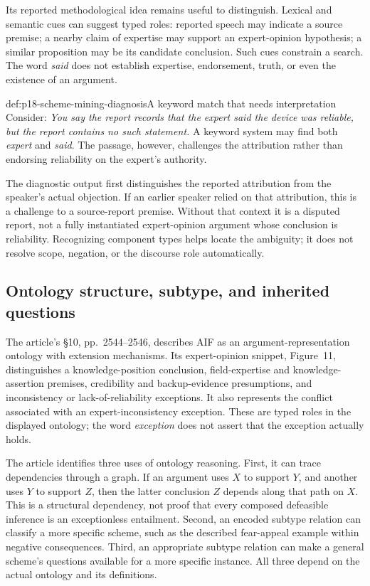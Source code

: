 Its reported methodological idea remains useful to distinguish.
Lexical and semantic cues can suggest typed roles: reported speech
may indicate a source premise; a nearby claim of expertise may
support an expert-opinion hypothesis; a similar proposition may
be its candidate conclusion. Such cues constrain a search.
The word \emph{said} does not establish expertise, endorsement,
truth, or even the existence of an argument.

\begin{hbexample}{def:p18-scheme-mining-diagnosis}{A keyword match that needs interpretation}
Consider: \emph{You say the report records that the expert said the
device was reliable, but the report contains no such statement.}
A keyword system may find both \emph{expert} and \emph{said}.
The passage, however, challenges the attribution rather than
endorsing reliability on the expert's authority.

The diagnostic output first distinguishes the reported attribution
from the speaker's actual objection. If an earlier speaker relied
on that attribution, this is a challenge to a source-report premise.
Without that context it is a disputed report, not a fully instantiated
expert-opinion argument whose conclusion is reliability.
Recognizing component types helps locate the ambiguity; it does
not resolve scope, negation, or the discourse role automatically.
\end{hbexample}

\subsection{Ontology structure, subtype, and inherited questions}

The article's \S10, pp.~2544--2546, describes AIF as an
argument-representation ontology with extension mechanisms.
Its expert-opinion snippet, Figure~11, distinguishes a knowledge-position
conclusion, field-expertise and knowledge-assertion premises,
credibility and backup-evidence presumptions, and inconsistency
or lack-of-reliability exceptions. It also represents the conflict
associated with an expert-inconsistency exception.
These are typed roles in the displayed ontology; the word
\emph{exception} does not assert that the exception actually holds.

The article identifies three uses of ontology reasoning.
First, it can trace dependencies through a graph. If an argument
uses \(X\) to support \(Y\), and another uses \(Y\) to support \(Z\),
then the latter conclusion \(Z\) depends along that path on \(X\).
This is a structural dependency, not proof that every composed
defeasible inference is an exceptionless entailment.
Second, an encoded subtype relation can classify a more specific
scheme, such as the described fear-appeal example within negative
consequences. Third, an appropriate subtype relation can make a
general scheme's questions available for a more specific instance.
All three depend on the actual ontology and its definitions.

